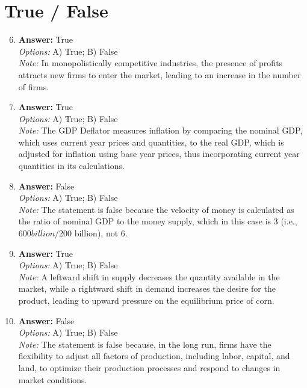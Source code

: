\documentclass[12pt]{article}
\begin{document}
\section*{True / False}
\begin{enumerate}[label=\arabic*.]
\setcounter{enumi}{5}
\item \textbf{Answer:} True
\\ \textit{Options:} A) True; B) False
\\ \textit{Note:} In monopolistically competitive industries, the presence of profits attracts new firms to enter the market, leading to an increase in the number of firms.
\item \textbf{Answer:} True
\\ \textit{Options:} A) True; B) False
\\ \textit{Note:} The GDP Deflator measures inflation by comparing the nominal GDP, which uses current year prices and quantities, to the real GDP, which is adjusted for inflation using base year prices, thus incorporating current year quantities in its calculations.
\item \textbf{Answer:} False
\\ \textit{Options:} A) True; B) False
\\ \textit{Note:} The statement is false because the velocity of money is calculated as the ratio of nominal GDP to the money supply, which in this case is 3 (i.e., $600 billion / $200 billion), not 6.
\item \textbf{Answer:} True
\\ \textit{Options:} A) True; B) False
\\ \textit{Note:} A leftward shift in supply decreases the quantity available in the market, while a rightward shift in demand increases the desire for the product, leading to upward pressure on the equilibrium price of corn.
\item \textbf{Answer:} False
\\ \textit{Options:} A) True; B) False
\\ \textit{Note:} The statement is false because, in the long run, firms have the flexibility to adjust all factors of production, including labor, capital, and land, to optimize their production processes and respond to changes in market conditions.
\end{enumerate}
\end{document}

